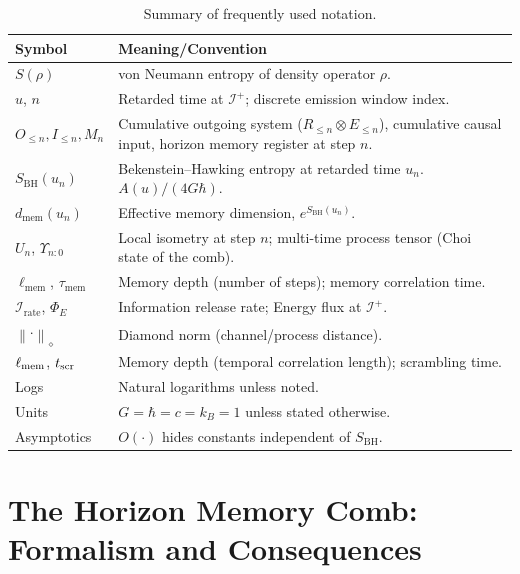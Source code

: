 \documentclass[a4paper,11pt]{article}
\newcommand{\Irate}{\mathcal{I}_{\mathrm{rate}}}
\newcommand{\Eflux}{\Phi_E}
\newcommand{\Ddiamond}[1]{\left\|#1\right\|_\diamond}
\newcommand{\dmem}{\ensuremath{d_{\mathrm{mem}}}}
\newcommand{\ellmem}{\ensuremath{\ell_{\mathrm{mem}}}}
\newcommand{\taumem}{\ensuremath{\tau_{\mathrm{mem}}}}
\theoremstyle{plain}
\theoremstyle{definition}
\theoremstyle{remark}
\begin{document}
\begin{table}[hbtp]
\centering
\caption{Summary of frequently used notation.}
\label{tab:notation_summary}
\footnotesize
\begin{tabularx}{\textwidth}{@{}lX@{}}
\toprule
\textbf{Symbol} & \textbf{Meaning/Convention} \\
\midrule
\(S(\rho)\) & von Neumann entropy of density operator \(\rho\). \\
\(u\), \(n\) & Retarded time at \(\mathcal{I}^+\); discrete emission window index. \\
\(O_{\le n}, I_{\le n}, M_n\) & Cumulative outgoing system ($R_{\le n} \otimes E_{\le n}$), cumulative causal input, horizon memory register at step \(n\). \\
\(S_{\mathrm{BH}}(u_n)\) & Bekenstein--Hawking entropy at retarded time \(u_n\). \(A(u)/(4G\hbar)\). \\
\(\dmem(u_n)\) & Effective memory dimension, \(e^{S_{\mathrm{BH}}(u_n)}\). \\
\(U_n\), \(\Upsilon_{n{:}0}\) & Local isometry at step \(n\); multi-time process tensor (Choi state of the comb). \\
\(\ellmem\), \(\taumem\) & Memory depth (number of steps); memory correlation time. \\
\(\Irate\), \(\Eflux\) & Information release rate; Energy flux at ${\mathcal I}^+$. \\
\(\Ddiamond{\cdot}\) & Diamond norm (channel/process distance). \\
\(\ell_{\rm mem}\), \(t_{\rm scr}\) & Memory depth (temporal correlation length); scrambling time. \\
Logs & Natural logarithms unless noted. \\
Units & \(G=\hbar=c=k_B=1\) unless stated otherwise. \\
Asymptotics & \(O(\cdot)\) hides constants independent of \(S_{\mathrm{BH}}\). \\
\bottomrule
\end{tabularx}
\end{table}


\section{The Horizon Memory Comb: Formalism and Consequences}
\label{sec:formalism_consequences}
\end{document}
